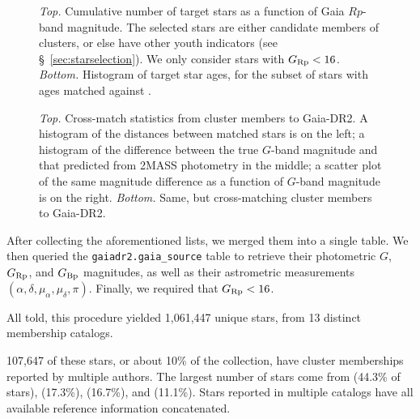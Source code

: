 \documentclass[12pt,twocolumn,tighten]{aastex62}
\begin{document}
\begin{figure}[t]
	\begin{center}
		\leavevmode
    \vspace{-0.8cm}
	\end{center}
	\vspace{-0.8cm}
	\caption{
    {\it Top.} Cumulative number of target stars as
    a function of Gaia $Rp$-band magnitude.  The selected stars are
    either candidate members of clusters, or else have other youth
    indicators (see \S~\ref{sec:starselection}). We only consider
    stars with $G_{\rm Rp} < 16$.
    {\it Bottom.} Histogram of target star ages, for the subset of
    stars with ages matched against \citet{Kharchenko_et_al_2013}.
	\label{fig:cdips_targets}
	}
\end{figure}

\begin{figure}[!ht]
	\vspace{-0.8cm}
	\caption{
    {\it Top.} Cross-match statistics from
    \cite{Kharchenko_et_al_2013} cluster members to Gaia-DR2. A
    histogram of the distances between matched stars is on the left; a
    histogram of the difference between the true $G$-band magnitude
    and that predicted from 2MASS photometry in the middle; a scatter
    plot of the same magnitude difference as a function of $G$-band
    magnitude is on the right.
    {\it Bottom.} Same, but cross-matching \cite{dias_proper_2014}
    cluster members to Gaia-DR2.
	}
	\label{fig:xmatch_info}
\end{figure}


After collecting the aforementioned lists, we
merged them into a single table. We then queried the
\texttt{gaiadr2.gaia\_source} table to retrieve their photometric $G$,
$G_{\rm Rp}$, and $G_{\rm Bp}$ magnitudes, as well as their
astrometric measurements $(\alpha, \delta, \mu_\alpha, \mu_\delta,
\pi)$.  Finally, we required that $G_{\rm Rp} < 16$.  

All told, this procedure yielded 1{,}061{,}447 unique stars, from 13 distinct
membership catalogs.

107{,}647 of these stars, or about
10\% of the collection, have cluster memberships reported by
multiple authors.  The largest number of stars come from
\citealt{dias_proper_2014} (44.3\% of stars), \citealt{Kharchenko_et_al_2013}
(17.3\%), \citealt{cantat-gaudin_gaia_2018} (16.7\%), and \citealt{zari_3d_2018}
(11.1\%). %
Stars reported in multiple catalogs have all available reference information
concatenated.  
\end{document}
